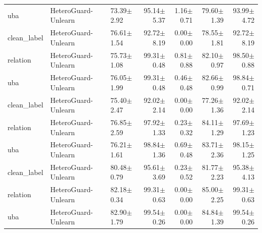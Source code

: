 \begin{table}[t]
\begin{tabular}{lllrrrr}
uba & HeteroGuard-Unlearn & 73.39$\pm$2.92 & 95.14$\pm$5.37 & 1.16$\pm$0.71 & 79.60$\pm$1.39 & 93.99$\pm$4.72 \\
clean_label & HeteroGuard-Unlearn & 76.61$\pm$1.54 & 92.72$\pm$8.19 & 0.00$\pm$0.00 & 78.55$\pm$1.81 & 92.72$\pm$8.19 \\
relation & HeteroGuard-Unlearn & 75.73$\pm$1.08 & 99.31$\pm$0.48 & 0.81$\pm$0.88 & 82.10$\pm$0.97 & 98.50$\pm$0.88 \\
uba & HeteroGuard-Unlearn & 76.05$\pm$1.99 & 99.31$\pm$0.48 & 0.46$\pm$0.48 & 82.66$\pm$0.99 & 98.84$\pm$0.71 \\
clean_label & HeteroGuard-Unlearn & 75.40$\pm$2.47 & 92.02$\pm$2.14 & 0.00$\pm$0.00 & 77.26$\pm$1.36 & 92.02$\pm$2.14 \\
relation & HeteroGuard-Unlearn & 76.85$\pm$2.59 & 97.92$\pm$1.33 & 0.23$\pm$0.32 & 84.11$\pm$1.29 & 97.69$\pm$1.23 \\
uba & HeteroGuard-Unlearn & 76.21$\pm$1.61 & 98.84$\pm$1.36 & 0.69$\pm$0.48 & 83.71$\pm$2.36 & 98.15$\pm$1.25 \\
clean_label & HeteroGuard-Unlearn & 80.48$\pm$0.79 & 95.61$\pm$3.69 & 0.23$\pm$0.52 & 81.77$\pm$2.23 & 95.38$\pm$4.13 \\
relation & HeteroGuard-Unlearn & 82.18$\pm$0.34 & 99.31$\pm$0.63 & 0.00$\pm$0.00 & 85.00$\pm$2.25 & 99.31$\pm$0.63 \\
uba & HeteroGuard-Unlearn & 82.90$\pm$1.79 & 99.54$\pm$0.26 & 0.00$\pm$0.00 & 84.84$\pm$1.39 & 99.54$\pm$0.26 \\
\bottomrule
\end{tabular}
\end{table}
